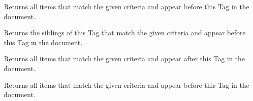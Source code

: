 \documentclass[letterpaper,10pt,english]{sphinxmanual}
\begin{document}
\begin{fulllineitems}

\begin{fulllineitems}
\label{SamPy.parsing:SamPy.parsing.BeautifulSoup.PageElement.fetchPrevious}
Returns all items that match the given criteria and appear
before this Tag in the document.

\end{fulllineitems}



\begin{fulllineitems}
\label{SamPy.parsing:SamPy.parsing.BeautifulSoup.PageElement.fetchPreviousSiblings}
Returns the siblings of this Tag that match the given
criteria and appear before this Tag in the document.

\end{fulllineitems}



\begin{fulllineitems}
\label{SamPy.parsing:SamPy.parsing.BeautifulSoup.PageElement.findAllNext}
Returns all items that match the given criteria and appear
after this Tag in the document.

\end{fulllineitems}



\begin{fulllineitems}
\label{SamPy.parsing:SamPy.parsing.BeautifulSoup.PageElement.findAllPrevious}
Returns all items that match the given criteria and appear
before this Tag in the document.

\end{fulllineitems}




\end{fulllineitems}
\end{document}
